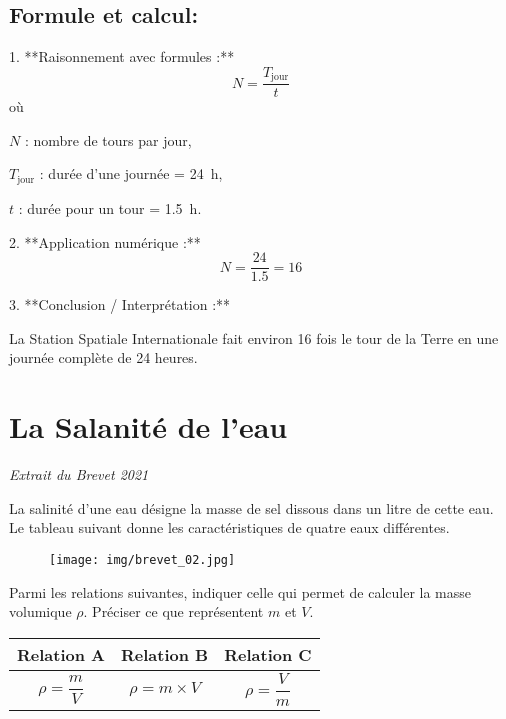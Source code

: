 \documentclass[answers]{exam}
\begin{document}
\begin{questions}
\begin{solution}
\subsection*{Formule et calcul:}

1. **Raisonnement avec formules :**
   \[
   N = \frac{T_{\text{jour}}}{t}
   \]
   où
   \begin{addmargin}[4em]{1em}
     \begin{compactitem}
         \item [\(N\)]: nombre de tours par jour,
         \item [\(T_{\text{jour}}\)]: durée d'une journée = \SI{24}{\hour},
         \item [\(t\)]: durée pour un tour = \SI{1.5}{\hour}.
     \end{compactitem}
   \end{addmargin}

2. **Application numérique :**
   \[
   N = \frac{24}{1.5} = 16
   \]

3. **Conclusion / Interprétation :** 

La Station Spatiale Internationale fait environ 16 fois le tour de la Terre en une journée complète de 24 heures.

\end{solution}

\section*{La Salanité de l'eau}

\textit{Extrait du Brevet 2021}
\vspace{1em}

La salinité d’une eau désigne la masse de sel dissous dans un litre de cette eau.
Le tableau suivant donne les caractéristiques de quatre eaux différentes.

\begin{figure}[H]
  \centering
  \texttt{[image: img/brevet\_02.jpg]}
\end{figure}

  \question[3] Parmi les relations suivantes, indiquer celle qui permet de calculer la masse volumique $\rho$. Préciser ce que représentent $m$ et $V$.

  \begin{center}
    \renewcommand{\arraystretch}{2} %
    \setlength{\tabcolsep}{20pt}   %
    \begin{tabular}{|c|c|c|}
    \hline
    Relation A & Relation B & Relation C \\
    \hline
    $\rho = \dfrac{m}{V}$ & $\rho = m \times V$ & $\rho = \dfrac{V}{m}$ \\
    \hline
    \end{tabular}
    \end{center}
  

\end{questions}
\end{document}
